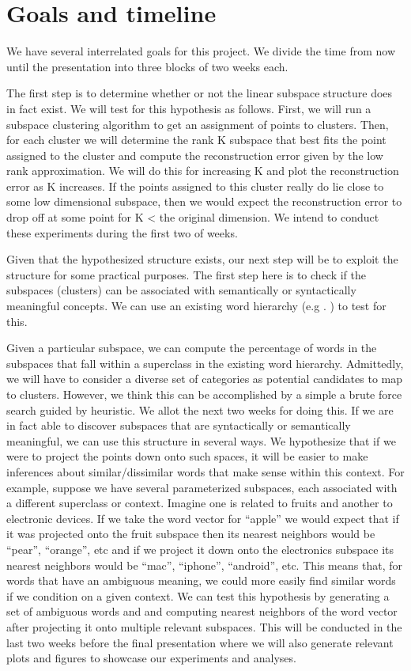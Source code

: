\section{Goals and timeline}

We have several interrelated goals for this project. 
We divide the time from now until the presentation into three blocks of two weeks each.
 
The first step is to determine whether or not the linear subspace structure does in fact exist. 
We will test for this hypothesis as follows. 
 First, we will run a subspace clustering algorithm to get an assignment of points to clusters. 
Then, for each cluster we will determine the rank K subspace that best fits the point assigned to the cluster and compute the reconstruction error given by the low rank approximation. 
We will do this for increasing K and plot the reconstruction error as K increases. 
If the points assigned to this cluster really do lie close to some low dimensional subspace, then we would expect the reconstruction error to drop off at some point for K < the original dimension. 
We intend to conduct these experiments during the first two of weeks.
 
	Given that the hypothesized structure exists, our next step will be to exploit the structure for some practical purposes. 
The first step here is to check if the subspaces (clusters) can be associated with semantically or syntactically meaningful concepts. 
We can use an existing word hierarchy (e.g
. ) to test for this. 
 
Given a particular subspace, we can compute the percentage of words in the subspaces that fall within a superclass in the existing word hierarchy. 
Admittedly, we will have to consider a diverse set of categories as potential candidates to map to clusters. 
However, we think this can be accomplished by a simple a brute force search guided by heuristic. 
We allot the next two weeks for doing this. 
If we are in fact able to discover subspaces that are syntactically or semantically meaningful, we can use this structure in several ways. 
We hypothesize that if we were to project the points down onto such spaces, it will be easier to make inferences about similar/dissimilar words that make sense within this context. 
For example, suppose we have several parameterized subspaces, each associated with a different superclass or context. 
Imagine one is related to fruits and another to electronic devices. 
If we take the word vector for “apple” we would expect that if it was projected onto the fruit subspace then its nearest neighbors would be “pear”, “orange”, etc and if we project it down onto the electronics subspace its nearest neighbors would be “mac”, “iphone”, “android”, etc. 
This means that, for words that have an ambiguous meaning,  we could more easily find similar words if we condition on a given context. 
We can test this hypothesis by generating a set of ambiguous words and and computing nearest neighbors of the word vector after projecting it onto multiple relevant subspaces. 
This will be conducted in the last two weeks before the final presentation where we will also generate relevant plots and figures to showcase our experiments and analyses. 
 
